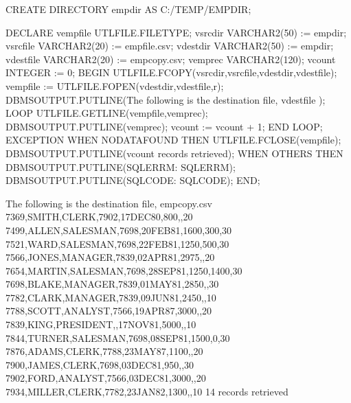 \documentclass[letterpaper,10pt,english,openany,oneside]{sphinxmanual}
\begin{document}
%
\begin{sphinxVerbatim}[commandchars=\\\{\}]
CREATE DIRECTORY empdir AS \PYGZsq{}C:/TEMP/EMPDIR\PYGZsq{};

DECLARE
    v\PYGZus{}empfile       UTL\PYGZus{}FILE.FILE\PYGZus{}TYPE;
    v\PYGZus{}src\PYGZus{}dir       VARCHAR2(50) := \PYGZsq{}empdir\PYGZsq{};
    v\PYGZus{}src\PYGZus{}file      VARCHAR2(20) := \PYGZsq{}empfile.csv\PYGZsq{};
    v\PYGZus{}dest\PYGZus{}dir      VARCHAR2(50) := \PYGZsq{}empdir\PYGZsq{};
    v\PYGZus{}dest\PYGZus{}file     VARCHAR2(20) := \PYGZsq{}empcopy.csv\PYGZsq{};
    v\PYGZus{}emprec        VARCHAR2(120);
    v\PYGZus{}count         INTEGER := 0;
BEGIN
    UTL\PYGZus{}FILE.FCOPY(v\PYGZus{}src\PYGZus{}dir,v\PYGZus{}src\PYGZus{}file,v\PYGZus{}dest\PYGZus{}dir,v\PYGZus{}dest\PYGZus{}file);
    v\PYGZus{}empfile := UTL\PYGZus{}FILE.FOPEN(v\PYGZus{}dest\PYGZus{}dir,v\PYGZus{}dest\PYGZus{}file,\PYGZsq{}r\PYGZsq{});
    DBMS\PYGZus{}OUTPUT.PUT\PYGZus{}LINE(\PYGZsq{}The following is the destination file, \PYGZsq{}\PYGZsq{}\PYGZsq{} \textbar{}\textbar{}
        v\PYGZus{}dest\PYGZus{}file \textbar{}\textbar{} \PYGZsq{}\PYGZsq{}\PYGZsq{}\PYGZsq{});
    LOOP
        UTL\PYGZus{}FILE.GET\PYGZus{}LINE(v\PYGZus{}empfile,v\PYGZus{}emprec);
        DBMS\PYGZus{}OUTPUT.PUT\PYGZus{}LINE(v\PYGZus{}emprec);
        v\PYGZus{}count := v\PYGZus{}count + 1;
    END LOOP;
    EXCEPTION
        WHEN NO\PYGZus{}DATA\PYGZus{}FOUND THEN
            UTL\PYGZus{}FILE.FCLOSE(v\PYGZus{}empfile);
            DBMS\PYGZus{}OUTPUT.PUT\PYGZus{}LINE(v\PYGZus{}count \textbar{}\textbar{} \PYGZsq{} records retrieved\PYGZsq{});
        WHEN OTHERS THEN
            DBMS\PYGZus{}OUTPUT.PUT\PYGZus{}LINE(\PYGZsq{}SQLERRM: \PYGZsq{} \textbar{}\textbar{} SQLERRM);
            DBMS\PYGZus{}OUTPUT.PUT\PYGZus{}LINE(\PYGZsq{}SQLCODE: \PYGZsq{} \textbar{}\textbar{} SQLCODE);
END;

The following is the destination file, \PYGZsq{}empcopy.csv\PYGZsq{}
7369,SMITH,CLERK,7902,17\PYGZhy{}DEC\PYGZhy{}80,800,,20
7499,ALLEN,SALESMAN,7698,20\PYGZhy{}FEB\PYGZhy{}81,1600,300,30
7521,WARD,SALESMAN,7698,22\PYGZhy{}FEB\PYGZhy{}81,1250,500,30
7566,JONES,MANAGER,7839,02\PYGZhy{}APR\PYGZhy{}81,2975,,20
7654,MARTIN,SALESMAN,7698,28\PYGZhy{}SEP\PYGZhy{}81,1250,1400,30
7698,BLAKE,MANAGER,7839,01\PYGZhy{}MAY\PYGZhy{}81,2850,,30
7782,CLARK,MANAGER,7839,09\PYGZhy{}JUN\PYGZhy{}81,2450,,10
7788,SCOTT,ANALYST,7566,19\PYGZhy{}APR\PYGZhy{}87,3000,,20
7839,KING,PRESIDENT,,17\PYGZhy{}NOV\PYGZhy{}81,5000,,10
7844,TURNER,SALESMAN,7698,08\PYGZhy{}SEP\PYGZhy{}81,1500,0,30
7876,ADAMS,CLERK,7788,23\PYGZhy{}MAY\PYGZhy{}87,1100,,20
7900,JAMES,CLERK,7698,03\PYGZhy{}DEC\PYGZhy{}81,950,,30
7902,FORD,ANALYST,7566,03\PYGZhy{}DEC\PYGZhy{}81,3000,,20
7934,MILLER,CLERK,7782,23\PYGZhy{}JAN\PYGZhy{}82,1300,,10
14 records retrieved
\end{sphinxVerbatim}
\end{document}
